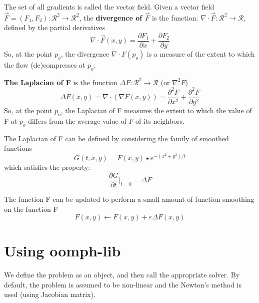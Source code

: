 The set of all gradients is called the vector field. Given a vector field
$\vec{F}=(F_1,F_2): \mathcal{R}^2\rightarrow \mathcal{R}^2$, the {\bf divergence
of $\vec{F}$} is the function: $\nabla \cdot \vec{F}: \mathcal{R}^2\rightarrow
\mathcal{R}$, defined by the partial derivatives
\begin{equation}
\nabla \cdot \vec{F}(x,y) = \frac{\partial F_1}{\partial x} + \frac{\partial
F_2}{\partial y}
\end{equation}
So, at the point $p_o$, the divergence $\nabla\cdot F(p_o)$ is a measure of the
extent to which the flow (de)compresses at $p_o$.

{\bf The Laplacian of F} is the function $\Delta F: \mathcal{R}^2\rightarrow
\mathcal{R}$ (or $\nabla^2F$)
\begin{equation}
\Delta F(x,y) = \nabla\cdot\left(\nabla F(x,y) \right) = \frac{\partial^2
F}{\partial x^2} + \frac{\partial^2 F}{\partial y^2}
\end{equation}
So, at the point $p_o$, the Laplacian of F measures the extent to which the
value of F at $p_o$ differs from the average value of $F$ of its neighbors.  

The Laplacian of F can be defined by considering the family of smoothed
functions
\begin{equation}
G(t,x,y) = F(x,y)\star e^{-\left(x^2+y^2\right)/t}
\end{equation}
which satisfies the property: 
\begin{equation}
\frac{\partial G}{\partial t}|_{t=0}=\Delta F
\end{equation}

The function F can be updated to perform a small amount of function smoothing on
the function F
\begin{equation}
F(x,y) \leftarrow F(x,y) + \varepsilon \Delta F(x,y)
\end{equation}





\section{Using oomph-lib}
\label{sec:oomph-lib_how2use}

We define the problem as an object, and then call the appropriate solver. By
default, the problem is assumed to be non-linear and the Newton's method is used
(using Jacobian matrix).

